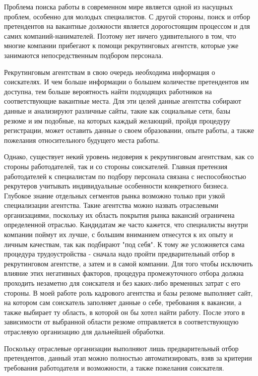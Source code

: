 \Introduction
Проблема поиска работы в современном мире является одной из насущных проблем, особенно для молодых специалистов. С другой стороны, поиск и отбор претендентов на вакантные должности является дорогостоящим процессом и для самих компаний-нанимателей. Поэтому нет ничего удивительного в том, что многие компании прибегают к помощи рекрутинговых агентств, которые уже занимаются непосредственным подбором персонала.
 
Рекрутинговым агентствам в свою очередь необходима информация о соискателях. И чем больше информации о большем количестве претендентов им доступна, тем больше вероятность найти подходящих работников на соответствующие вакантные места. Для эти целей данные агентства собирают данные и анализируют различные сайты, такие как социальные сети, базы резюме и им подобные, на которых каждый желающий, пройдя процедуру регистрации, может оставить данные о своем образовании, опыте работы, а также пожелания относительного будущего места работы.

Однако, существует некий уровень недоверия к рекрутинговым агентствам, как со стороны работодателей, так и со стороны соискателей.
Главная претензия работодателей к специалистам по подбору персонала связана с неспособностью рекрутеров учитывать индивидуальные особенности конкретного бизнеса. Глубокое знание отдельных сегментов рынка возможно только при узкой специализации агентства. Такие агентства можно назвать отраслевыми организациями, поскольку их область покрытия рынка вакансий ограничена определенной отраслью.
Кандидатам же часто кажется, что специалисты внутри компании поймут их лучше, с большим вниманием отнесутся к их опыту и личным качествам, так как подбирают "под себя". К тому же усложняется сама процедура трудоустройства - сначала надо пройти предварительный отбор в рекрутинговом агентстве, а затем и в самой компании. Для того чтобы исключить влияние этих негативных факторов, процедура промежуточного отбора должна проходить незаметно для соискателя и без каких-либо временных затрат с его стороны.
В моей работе роль кадрового агентства и базы резюме выполняет сайт, на котором сам соискатель заполняет данные о себе, требования к вакансии, а также выбирает ту область, в которой он бы хотел найти работу.
После этого в зависимости от выбранной области резюме отправляется  в соответствующую отраслевую организацию для дальнейшей обработки.

Поскольку отраслевые организации выполняют лишь предварительный отбор претендентов, данный этап можно полностью автоматизировать, взяв за критерии требования работодателя и возможности, а также пожелания соискателя.

